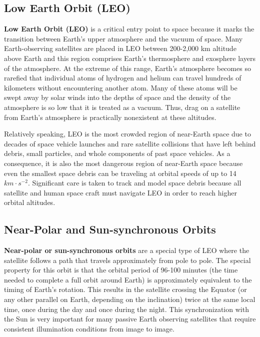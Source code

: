 \documentclass[
]{book}
\begin{document}
\hypertarget{low-earth-orbit-leo}{%
\subsection{Low Earth Orbit (LEO)}\label{low-earth-orbit-leo}}

\textbf{Low Earth Orbit (LEO)} is a critical entry point to space because it marks the transition between Earth's upper atmosphere and the vacuum of space. Many Earth-observing satellites are placed in LEO between 200-2,000 km altitude above Earth and this region comprises Earth's thermosphere and exosphere layers of the atmosphere. At the extreme of this range, Earth's atmosphere becomes so rarefied that individual atoms of hydrogen and helium can travel hundreds of kilometers without encountering another atom. Many of these atoms will be swept away by solar winds into the depths of space and the density of the atmosphere is so low that it is treated as a vacuum. Thus, drag on a satellite from Earth's atmosphere is practically nonexistent at these altitudes.

Relatively speaking, LEO is the most crowded region of near-Earth space due to decades of space vehicle launches and rare satellite collisions that have left behind debris, small particles, and whole components of past space vehicles. As a consequence, it is also the most dangerous region of near-Earth space because even the smallest space debris can be traveling at orbital speeds of up to 14 \(km·s^{-2}\). Significant care is taken to track and model space debris because all satellite and human space craft must navigate LEO in order to reach higher orbital altitudes.

\hypertarget{near-polar-and-sun-synchronous-orbits}{%
\subsection{Near-Polar and Sun-synchronous Orbits}\label{near-polar-and-sun-synchronous-orbits}}

\textbf{Near-polar or sun-synchronous orbits} are a special type of LEO where the satellite follows a path that travels approximately from pole to pole. The special property for this orbit is that the orbital period of 96-100 minutes (the time needed to complete a full orbit around Earth) is approximately equivalent to the timing of Earth's rotation. This results in the satellite crossing the Equator (or any other parallel on Earth, depending on the inclination) twice at the same local time, once during the day and once during the night. This synchronization with the Sun is very important for many passive Earth observing satellites that require consistent illumination conditions from image to image.
\end{document}
